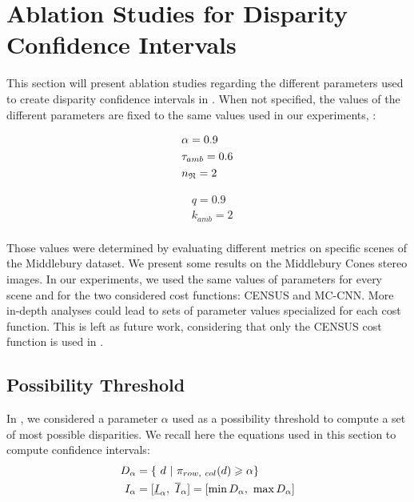 \section{Ablation Studies for Disparity Confidence Intervals}\label{sec:ablation_study}
This section will present ablation studies regarding the different parameters used to create disparity confidence intervals in . When not specified, the values of the different parameters are fixed to the same values used in our experiments, \ie:\newline\medskip
\begin{minipage}{0.5\linewidth}
\begin{align*}
    &\alpha = 0.9\\
    &\tau_{amb} = 0.6\\
    &n_{\mathfrak{N}} = 2
\end{align*}
\end{minipage}
\begin{minipage}{0.5\linewidth}
\begin{align*}
    &q = 0.9\\
    &k_{amb} = 2\\
\end{align*}
\end{minipage}\bigskip\newline
Those values were determined by evaluating different metrics on specific scenes of the Middlebury dataset. We present some results on the Middlebury Cones stereo images. In our experiments, we used the same values of parameters for every scene and for the two considered cost functions: CENSUS and MC-CNN. More in-depth analyses could lead to sets of parameter values specialized for each cost function. This is left as future work, considering that only the CENSUS cost function is used in .

\subsection{Possibility Threshold}
In , we considered a parameter $\alpha$ used as a possibility threshold to compute a set of most possible disparities. We recall here the equations used in this section to compute confidence intervals:
\begin{align*}
    D_\alpha&=\{~ d ~|~ \pi_{row, ~col}(d)\geqslant\alpha\}\\
    I_\alpha &= [\underline{I}_\alpha,~\overline{I}_\alpha]=[\min D_\alpha, ~\max D_\alpha]
\end{align*}

